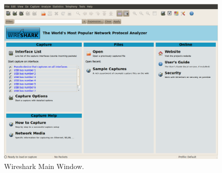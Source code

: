 \begin{figure}[ht]
	\centering
	\includegraphics[width=\linewidth]{graphics/wireshark-main-updated.png}	
	\caption{Wireshark Main Window.}
	\label{fig:lab1-wireshark-main}
\end{figure}

